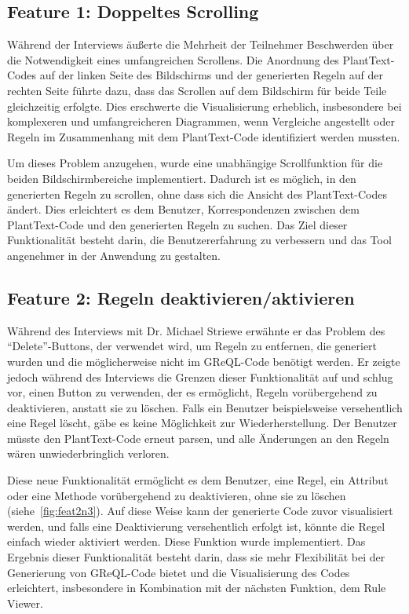 \subsection{Feature 1: Doppeltes Scrolling}

Während der Interviews äußerte die Mehrheit der Teilnehmer Beschwerden über die Notwendigkeit eines umfangreichen
Scrollens. Die Anordnung des PlantText-Codes auf der linken Seite des Bildschirms und der generierten Regeln auf der
rechten Seite führte dazu, dass das Scrollen auf dem Bildschirm für beide Teile gleichzeitig erfolgte. Dies erschwerte
die Visualisierung erheblich, insbesondere bei komplexeren und umfangreicheren Diagrammen, wenn Vergleiche angestellt
oder Regeln im Zusammenhang mit dem PlantText-Code identifiziert werden mussten.

Um dieses Problem anzugehen, wurde eine unabhängige Scrollfunktion für die beiden Bildschirmbereiche implementiert.
Dadurch ist es möglich, in den generierten Regeln zu scrollen, ohne dass sich die Ansicht des PlantText-Codes ändert.
Dies erleichtert es dem Benutzer, Korrespondenzen zwischen dem PlantText-Code und den generierten Regeln zu suchen. Das
Ziel dieser Funktionalität besteht darin, die Benutzererfahrung zu verbessern und das Tool angenehmer in der Anwendung
zu gestalten.

\subsection{Feature 2: Regeln deaktivieren/aktivieren}

Während des Interviews mit Dr. Michael Striewe erwähnte er das Problem des ``Delete''-Buttons, der verwendet wird, um
Regeln zu entfernen, die generiert wurden und die möglicherweise nicht im GReQL-Code benötigt werden. Er zeigte jedoch
während des Interviews die Grenzen dieser Funktionalität auf und schlug vor, einen Button zu verwenden, der es
ermöglicht, Regeln vorübergehend zu deaktivieren, anstatt sie zu löschen. Falls ein Benutzer beispielsweise
versehentlich eine Regel löscht, gäbe es keine Möglichkeit zur Wiederherstellung. Der Benutzer müsste den PlantText-Code
erneut parsen, und alle Änderungen an den Regeln wären unwiederbringlich verloren.

Diese neue Funktionalität ermöglicht es dem Benutzer, eine Regel, ein Attribut oder eine Methode vorübergehend zu
deaktivieren, ohne sie zu löschen (siehe~\ref{fig:feat2n3}). Auf diese Weise kann der generierte Code zuvor visualisiert werden, und falls eine
Deaktivierung versehentlich erfolgt ist, könnte die Regel einfach wieder aktiviert werden. Diese Funktion wurde
implementiert. Das Ergebnis dieser Funktionalität besteht darin, dass sie mehr Flexibilität bei der Generierung von
GReQL-Code bietet und die Visualisierung des Codes erleichtert, insbesondere in Kombination mit der nächsten Funktion,
dem Rule Viewer.


